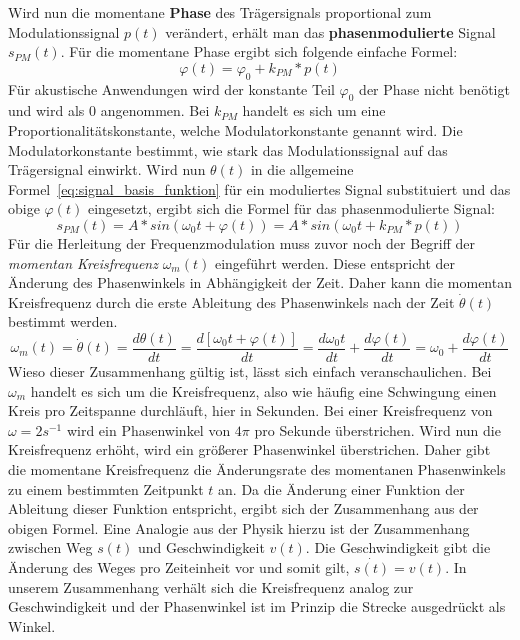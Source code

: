 Wird nun die momentane \textbf{Phase} des Trägersignals proportional zum Modulationssignal \(p(t)\) verändert, erhält man das \textbf{phasenmodulierte} Signal \(s_{PM}(t)\). \cite[S. 209]{lathi}
Für die momentane Phase ergibt sich folgende einfache Formel:
\begin{equation}
\varphi(t)=\varphi_0+k_{PM}*p(t)
\label{eq:varphi_t}
\end{equation}
Für akustische Anwendungen wird der konstante Teil \(\varphi_0\) der Phase nicht benötigt und wird als 0 angenommen. Bei \(k_{PM}\) handelt es sich um eine Proportionalitätskonstante, welche Modulatorkonstante genannt wird. Die Modulatorkonstante bestimmt, wie stark das Modulationssignal auf das Trägersignal einwirkt. Wird nun \(\theta(t)\) in die allgemeine Formel~\ref{eq:signal_basis_funktion} für ein moduliertes Signal substituiert und das obige \(\varphi(t)\) eingesetzt, ergibt sich die Formel für das phasenmodulierte Signal:
\begin{equation}
s_{PM}(t)=A*sin(\omega_0t + \varphi(t))=A*sin(\omega_0t+k_{PM}*p(t))
\label{eq:s_pm}
\end{equation}
Für die Herleitung der Frequenzmodulation muss zuvor noch der Begriff der \textit{momentan Kreisfrequenz} \(\omega_m(t)\) eingeführt werden.
Diese entspricht der Änderung des Phasenwinkels in Abhängigkeit der Zeit. Daher kann die momentan Kreisfrequenz durch die erste Ableitung des Phasenwinkels nach der Zeit $\dot \theta(t)$ bestimmt werden. \cite[S. 209]{lathi}
\begin{equation}
\omega_m(t)=\dot \theta(t)=\frac{d\theta(t)}{dt}=\frac{d[\omega_0t+\varphi(t)]}{dt}=\frac{d\omega_0t}{dt}+\frac{d\varphi(t)}{dt}=\omega_0+\frac{d\varphi(t)}{dt}
\label{eq:omega_m_herleitung}
\end{equation}
Wieso dieser Zusammenhang gültig ist, lässt sich einfach veranschaulichen. Bei \(\omega_m\) handelt es sich um die Kreisfrequenz, also wie häufig eine Schwingung einen Kreis pro Zeitspanne durchläuft, hier in Sekunden. Bei einer Kreisfrequenz von \(\omega=2 s^{-1}\) wird ein Phasenwinkel von \(4\pi\) pro Sekunde überstrichen. Wird nun die Kreisfrequenz erhöht, wird ein größerer Phasenwinkel überstrichen. Daher gibt die momentane Kreisfrequenz die Änderungsrate des momentanen Phasenwinkels zu einem bestimmten Zeitpunkt \(t\) an. Da die Änderung einer Funktion der Ableitung dieser Funktion entspricht, ergibt sich der Zusammenhang aus der obigen Formel. Eine Analogie aus der Physik hierzu ist der Zusammenhang zwischen Weg \(s(t)\) und Geschwindigkeit \(v(t)\). Die Geschwindigkeit gibt die Änderung des Weges pro Zeiteinheit vor und somit gilt, \(\dot{s(t)}=v(t)\). In unserem Zusammenhang verhält sich die Kreisfrequenz analog zur Geschwindigkeit und der Phasenwinkel ist im Prinzip die Strecke ausgedrückt als Winkel.

